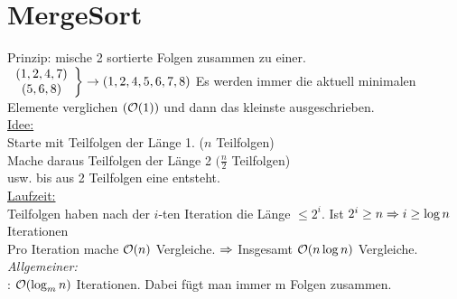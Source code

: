     \section{MergeSort}
        Prinzip: mische 2 sortierte Folgen zusammen zu einer. \\
        \begin{math}
	        \left.
	        	\begin{array}{c}
	        		(1, 2, 4, 7)\\
	        		(5,6,8) 
	        	\end{array}
	        \right\rbrace \rightarrow (1,2,4,5,6,7,8) \\
        \end{math}
        Es werden immer die aktuell minimalen Elemente verglichen $(\mathcal{O}(1))$ und dann das kleinste ausgeschrieben. \\
        \underline{Idee:} \\
        Starte mit Teilfolgen der Länge 1. ($n$ Teilfolgen) \\
        Mache daraus Teilfolgen der Länge 2 $(\frac{n}{2}$ Teilfolgen) \\
        usw. bis aus 2 Teilfolgen eine entsteht. \\
        \underline{Laufzeit:}\\
        Teilfolgen haben nach der $i$-ten Iteration die Länge $\leq 2^i$. Ist $2^i \geq n \Ra i \geq \log n$ Iterationen\\
        Pro Iteration mache $\mathcal{O}(n)$ Vergleiche. $\Ra$ Insgesamt $\mathcal{O}(n \log n)$ Vergleiche.\\
        \emph{Allgemeiner:} \\
        : $\mathcal{O}(\log_m n)$ Iterationen. Dabei fügt man immer m Folgen zusammen.
    


